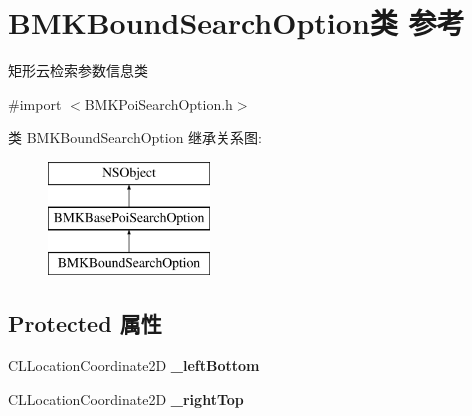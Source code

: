 \hypertarget{interface_b_m_k_bound_search_option}{\section{B\+M\+K\+Bound\+Search\+Option类 参考}
\label{interface_b_m_k_bound_search_option}
}


矩形云检索参数信息类  




{\ttfamily \#import $<$B\+M\+K\+Poi\+Search\+Option.\+h$>$}

类 B\+M\+K\+Bound\+Search\+Option 继承关系图\+:\begin{figure}[H]
\begin{center}
\leavevmode
\includegraphics[height=3.000000cm]{interface_b_m_k_bound_search_option}
\end{center}
\end{figure}
\subsection*{Protected 属性}
\begin{DoxyCompactItemize}
\item 
\hypertarget{interface_b_m_k_bound_search_option_a439e395186d7cb9f72bb2cea6c112a26}{C\+L\+Location\+Coordinate2\+D {\bfseries \+\_\+left\+Bottom}}\label{interface_b_m_k_bound_search_option_a439e395186d7cb9f72bb2cea6c112a26}

\item 
\hypertarget{interface_b_m_k_bound_search_option_a4bd165343e4ea38ceabb6da210c90793}{C\+L\+Location\+Coordinate2\+D {\bfseries \+\_\+right\+Top}}\label{interface_b_m_k_bound_search_option_a4bd165343e4ea38ceabb6da210c90793}

\end{DoxyCompactItemize}
